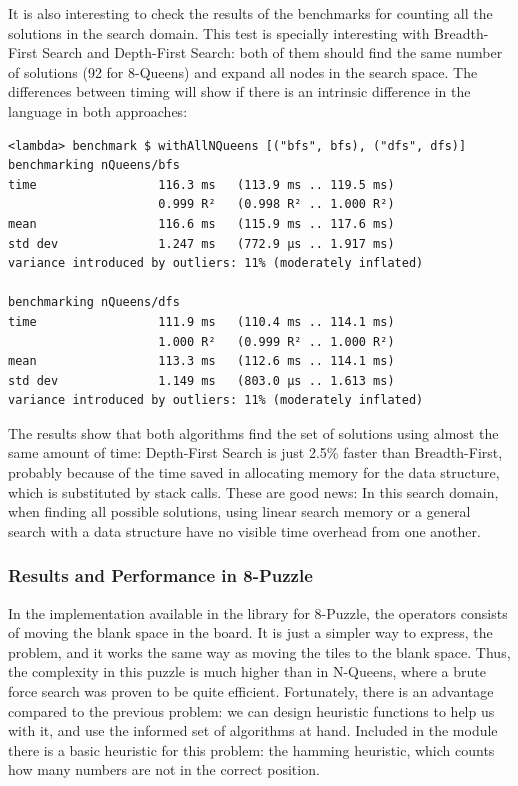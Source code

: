 It is also interesting to check the results of the benchmarks for counting all
the solutions in the search domain. This test is specially interesting with
Breadth-First Search and Depth-First Search: both of them should find the same
number of solutions (92 for 8-Queens) and expand all nodes in the search space.
The differences between timing will show if there is an intrinsic difference in
the language in both approaches:\\

\begin{lstlisting}
<lambda> benchmark $ withAllNQueens [("bfs", bfs), ("dfs", dfs)]
benchmarking nQueens/bfs
time                 116.3 ms   (113.9 ms .. 119.5 ms)
                     0.999 R²   (0.998 R² .. 1.000 R²)
mean                 116.6 ms   (115.9 ms .. 117.6 ms)
std dev              1.247 ms   (772.9 µs .. 1.917 ms)
variance introduced by outliers: 11% (moderately inflated)

benchmarking nQueens/dfs
time                 111.9 ms   (110.4 ms .. 114.1 ms)
                     1.000 R²   (0.999 R² .. 1.000 R²)
mean                 113.3 ms   (112.6 ms .. 114.1 ms)
std dev              1.149 ms   (803.0 µs .. 1.613 ms)
variance introduced by outliers: 11% (moderately inflated)
\end{lstlisting}

The results show that both algorithms find the set of solutions using almost
the same amount of time: Depth-First Search is just 2.5\% faster than
Breadth-First, probably because of the time saved in allocating memory for the
data structure, which is substituted by stack calls. These are good news: In
this search domain, when finding all possible solutions, using linear search
memory or a general search with a data structure have no visible time overhead
from one another.\\

\subsubsection{Results and Performance in 8-Puzzle}

In the implementation available in the library for 8-Puzzle, the operators
consists of moving the blank space in the board. It is just a simpler way to
express, the problem, and it works the same way as moving the tiles to the
blank space. Thus, the complexity in this puzzle is much higher than in
N-Queens, where a brute force search was proven to be quite efficient.
Fortunately, there is an advantage compared to the previous problem: we can
design heuristic functions to help us with it, and use the informed set of
algorithms at hand. Included in the module there is a basic heuristic for this
problem: the hamming heuristic, which counts how many numbers are not in the
correct position.\\

